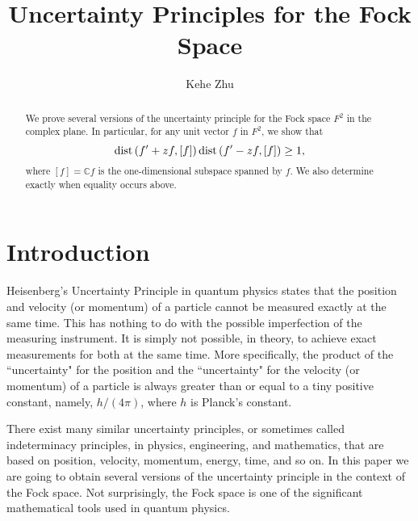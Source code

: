 \documentclass[12pt,reqno]{amsart}
\begin{document}
\title[Uncertainty Principle]{Uncertainty Principles for the Fock Space}

\author{Kehe Zhu}
\address{Department of Mathematics and Statistics\\
         State University of New York\\
         Albany, NY 12222, USA}


\begin{abstract}
We prove several versions of the uncertainty principle for the Fock space $F^2$ in the complex plane. 
In particular, for any unit vector $f$ in $F^2$, we show that
$${{\rm dist}\,}(f'+zf,[f])\,{{\rm dist}\,}(f'-zf,[f])\ge1,$$
where $[f]={{\mathbb C}} f$ is the one-dimensional subspace spanned by $f$. We also determine exactly when 
equality occurs above.
\end{abstract}

\maketitle

\section{Introduction}

Heisenberg's Uncertainty Principle in quantum physics states that the position and velocity (or momentum) of a particle 
cannot be measured exactly at the same time. This has nothing to do with the possible imperfection of the measuring 
instrument. It is simply not possible, in theory, to achieve exact measurements for both at the same time. More specifically, 
the product of the ``uncertainty" for the position and the ``uncertainty" for the velocity (or momentum) of a particle is always 
greater than or equal to a tiny positive constant, namely, $h/(4\pi)$, where $h$ is Planck's constant.

There exist many similar uncertainty principles, or sometimes called indeterminacy principles, in physics,
engineering, and mathematics, that are based on position, velocity, momentum, energy, time, and so on. 
In this paper we are going to obtain several versions of the uncertainty principle in the context of the Fock space.
Not surprisingly, the Fock space is one of the significant mathematical tools used in quantum physics.
\end{document}

